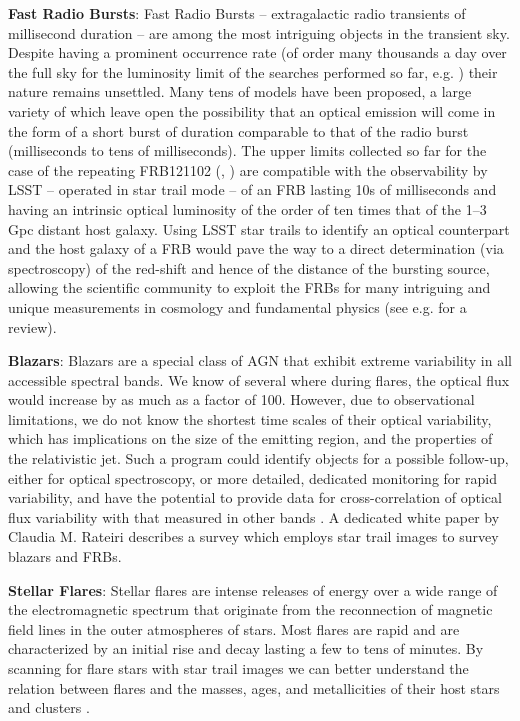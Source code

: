 \documentclass[12pt, letterpaper]{article}
\begin{document}
{\bf Fast Radio Bursts}: Fast Radio Bursts – extragalactic radio transients of millisecond duration – are among the most intriguing objects in the transient sky. Despite having a prominent occurrence rate (of order many thousands a day over the full sky for the luminosity limit of the searches performed so far, e.g. \citealt{keane}) their nature remains unsettled. Many tens of models have been proposed, a large variety of which leave open the possibility that an optical emission will come in the form of a short burst of duration comparable to that of the radio burst (milliseconds to tens of milliseconds). The upper limits collected so far for the case of the repeating FRB121102 (\citealt{2017MNRAS.472.2800H}, \citealt{2018MNRAS.481.2479M}) are compatible with the observability by LSST – operated in star trail mode – of an FRB lasting 10s of milliseconds and having an intrinsic optical luminosity of the order of ten times that of the 1--3 Gpc distant host galaxy. Using LSST star trails to identify an optical counterpart and the host galaxy of a FRB would pave the way to a direct determination (via spectroscopy) of the red-shift and hence of the distance of the bursting source, allowing the scientific community to exploit the FRBs for many intriguing and unique measurements in cosmology and fundamental physics (see e.g. \citealt{2018NatAs...2..836M} for a review).

{\bf Blazars}: Blazars are a special class of AGN that exhibit extreme variability in all accessible spectral bands. We know of several where during flares, the optical flux would increase by as much as a factor of 100. However, due to observational limitations, we do not know the shortest time scales of their optical variability, which has implications on the size of the emitting region, and the properties of the relativistic jet. Such a program could identify objects for a possible follow-up, either for optical spectroscopy, or more detailed, dedicated monitoring for rapid variability, and have the potential to provide data for cross-correlation of optical flux variability with that measured in other bands \citep{2012AA...545A..48R}. A dedicated white paper by Claudia M. Rateiri describes a survey which employs star trail images to survey blazars and FRBs.

{\bf Stellar Flares}: Stellar flares are intense releases of energy over a wide range of the electromagnetic spectrum that originate from the reconnection of magnetic field lines in the outer atmospheres of stars. Most flares are rapid and are characterized by an initial rise and decay lasting a few to tens of minutes. By scanning for flare stars with star trail images we can better understand the relation between flares and the masses, ages, and metallicities of their host stars and clusters \citep{2018arXiv180904510S, 2017ApJ...849...36Y}. 
\end{document}
